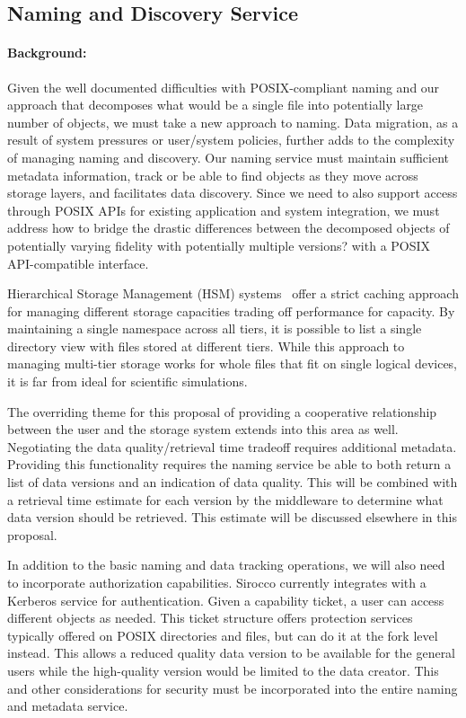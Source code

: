 \subsection{Naming and Discovery Service}
\label{sec:naming-discovery}
\paragraph{Background:}
Given the well documented difficulties with POSIX-compliant naming and our
approach that decomposes what would be a single file into potentially large
number of objects, we must take a new approach to naming.  Data migration, as a
result of system pressures or user/system policies, further adds to the
complexity of managing naming and discovery. Our naming service must maintain
sufficient metadata information, track or be able to find objects as they move
across storage layers, and facilitates data discovery. Since we need to also
support access through POSIX APIs for existing application and system
integration, we must address how to bridge the drastic differences between the
decomposed objects of potentially varying fidelity with potentially multiple
version{\color{red}s?} with a POSIX API-compatible interface.

Hierarchical Storage Management (HSM) systems~\cite{blaze:1992:hsm} offer a
strict caching approach for managing different storage capacities trading off
performance for capacity.  By maintaining a single namespace across all tiers,
it is possible to list a single directory view with files stored at different
tiers. While this approach to managing multi-tier storage works for whole files
that fit on single logical devices, it is far from ideal for scientific
simulations.

The overriding theme for this proposal of providing a cooperative relationship
between the user and the storage system extends into this area as well.
Negotiating the data quality/retrieval time tradeoff requires additional
metadata.  Providing this functionality requires the naming service be able to
both return a list of data versions and an indication of data quality. This
will be combined with a retrieval time estimate for each version by the
middleware to determine what data version should be retrieved.  This estimate
will be discussed elsewhere in this proposal.

In addition to the basic naming and data tracking operations, we will also need
to incorporate authorization capabilities. Sirocco currently integrates with a
Kerberos service for authentication. Given a capability ticket, a user can
access different objects as needed. This ticket structure offers protection
services typically offered on POSIX directories and files, but can do it at the
fork level instead. This allows a reduced quality data version to be available
for the general users while the high-quality version would be limited to the
data creator. This and other considerations for security must be incorporated
into the entire naming and metadata service.

